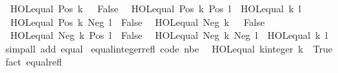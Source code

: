 \begin{isabellebody}
\ \ {\isachardoublequoteopen}HOL{\isachardot}{\kern0pt}equal\ {\isacharparenleft}{\kern0pt}Pos\ k{\isacharparenright}{\kern0pt}\ {}\ {\isasymlongleftrightarrow}\ False{\isachardoublequoteclose}\isanewline
\ \ {\isachardoublequoteopen}HOL{\isachardot}{\kern0pt}equal\ {\isacharparenleft}{\kern0pt}Pos\ k{\isacharparenright}{\kern0pt}\ {\isacharparenleft}{\kern0pt}Pos\ l{\isacharparenright}{\kern0pt}\ {\isasymlongleftrightarrow}\ HOL{\isachardot}{\kern0pt}equal\ k\ l{\isachardoublequoteclose}\isanewline
\ \ {\isachardoublequoteopen}HOL{\isachardot}{\kern0pt}equal\ {\isacharparenleft}{\kern0pt}Pos\ k{\isacharparenright}{\kern0pt}\ {\isacharparenleft}{\kern0pt}Neg\ l{\isacharparenright}{\kern0pt}\ {\isasymlongleftrightarrow}\ False{\isachardoublequoteclose}\isanewline
\ \ {\isachardoublequoteopen}HOL{\isachardot}{\kern0pt}equal\ {\isacharparenleft}{\kern0pt}Neg\ k{\isacharparenright}{\kern0pt}\ {}\ {\isasymlongleftrightarrow}\ False{\isachardoublequoteclose}\isanewline
\ \ {\isachardoublequoteopen}HOL{\isachardot}{\kern0pt}equal\ {\isacharparenleft}{\kern0pt}Neg\ k{\isacharparenright}{\kern0pt}\ {\isacharparenleft}{\kern0pt}Pos\ l{\isacharparenright}{\kern0pt}\ {\isasymlongleftrightarrow}\ False{\isachardoublequoteclose}\isanewline
\ \ {\isachardoublequoteopen}HOL{\isachardot}{\kern0pt}equal\ {\isacharparenleft}{\kern0pt}Neg\ k{\isacharparenright}{\kern0pt}\ {\isacharparenleft}{\kern0pt}Neg\ l{\isacharparenright}{\kern0pt}\ {\isasymlongleftrightarrow}\ HOL{\isachardot}{\kern0pt}equal\ k\ l{\isachardoublequoteclose}\isanewline
%
\isadelimproof
\ \ %
\endisadelimproof
%
\isatagproof
{}\isamarkupfalse%
\ {\isacharparenleft}{\kern0pt}simp{\isacharunderscore}{\kern0pt}all\ add{\isacharcolon}{\kern0pt}\ equal{\isacharparenright}{\kern0pt}%
\endisatagproof
{\isafoldproof}%
%
\isadelimproof
\isanewline
%
\endisadelimproof
\isanewline
{}\isamarkupfalse%
\ equal{\isacharunderscore}{\kern0pt}integer{\isacharunderscore}{\kern0pt}refl\ {\isacharbrackleft}{\kern0pt}code\ nbe{\isacharbrackright}{\kern0pt}{\isacharcolon}{\kern0pt}\isanewline
\ \ {\isachardoublequoteopen}HOL{\isachardot}{\kern0pt}equal\ {\isacharparenleft}{\kern0pt}k{\isacharcolon}{\kern0pt}{\isacharcolon}{\kern0pt}integer{\isacharparenright}{\kern0pt}\ k\ {\isasymlongleftrightarrow}\ True{\isachardoublequoteclose}\isanewline
%
\isadelimproof
\ \ %
\endisadelimproof
%
\isatagproof
{}\isamarkupfalse%
\ {\isacharparenleft}{\kern0pt}fact\ equal{\isacharunderscore}{\kern0pt}refl{\isacharparenright}{\kern0pt}%
\endisatagproof
{\isafoldproof}%
%
\isadelimproof

\end{isabellebody}

